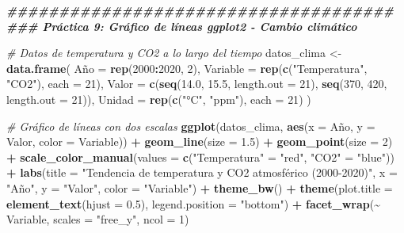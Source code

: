 \documentclass[
]{article}
\newenvironment{Shaded}{\begin{snugshade}}{\end{snugshade}}
\newcommand{\AttributeTok}[1]{\textcolor[rgb]{0.13,0.29,0.53}{#1}}
\newcommand{\CommentTok}[1]{\textcolor[rgb]{0.56,0.35,0.01}{\textit{#1}}}
\newcommand{\DecValTok}[1]{\textcolor[rgb]{0.00,0.00,0.81}{#1}}
\newcommand{\DocumentationTok}[1]{\textcolor[rgb]{0.56,0.35,0.01}{\textbf{\textit{#1}}}}
\newcommand{\FloatTok}[1]{\textcolor[rgb]{0.00,0.00,0.81}{#1}}
\newcommand{\FunctionTok}[1]{\textcolor[rgb]{0.13,0.29,0.53}{\textbf{#1}}}
\newcommand{\NormalTok}[1]{#1}
\newcommand{\OtherTok}[1]{\textcolor[rgb]{0.56,0.35,0.01}{#1}}
\newcommand{\SpecialCharTok}[1]{\textcolor[rgb]{0.81,0.36,0.00}{\textbf{#1}}}
\newcommand{\StringTok}[1]{\textcolor[rgb]{0.31,0.60,0.02}{#1}}
\begin{document}
\begin{Shaded}
\begin{Highlighting}[]
\DocumentationTok{\#\#\#\#\#\#\#\#\#\#\#\#\#\#\#\#\#\#\#\#\#\#\#\#\#\#\#\#\#\#\#\#\#\#\#\#\#}
\DocumentationTok{\#\#\# Práctica 9: Gráfico de líneas ggplot2 {-} Cambio climático}

\CommentTok{\# Datos de temperatura y CO2 a lo largo del tiempo}
\NormalTok{datos\_clima }\OtherTok{\textless{}{-}} \FunctionTok{data.frame}\NormalTok{(}
\NormalTok{  Año }\OtherTok{=} \FunctionTok{rep}\NormalTok{(}\DecValTok{2000}\SpecialCharTok{:}\DecValTok{2020}\NormalTok{, }\DecValTok{2}\NormalTok{),}
  \AttributeTok{Variable =} \FunctionTok{rep}\NormalTok{(}\FunctionTok{c}\NormalTok{(}\StringTok{"Temperatura"}\NormalTok{, }\StringTok{"CO2"}\NormalTok{), }\AttributeTok{each =} \DecValTok{21}\NormalTok{),}
  \AttributeTok{Valor =} \FunctionTok{c}\NormalTok{(}\FunctionTok{seq}\NormalTok{(}\FloatTok{14.0}\NormalTok{, }\FloatTok{15.5}\NormalTok{, }\AttributeTok{length.out =} \DecValTok{21}\NormalTok{), }
            \FunctionTok{seq}\NormalTok{(}\DecValTok{370}\NormalTok{, }\DecValTok{420}\NormalTok{, }\AttributeTok{length.out =} \DecValTok{21}\NormalTok{)),}
  \AttributeTok{Unidad =} \FunctionTok{rep}\NormalTok{(}\FunctionTok{c}\NormalTok{(}\StringTok{"°C"}\NormalTok{, }\StringTok{"ppm"}\NormalTok{), }\AttributeTok{each =} \DecValTok{21}\NormalTok{)}
\NormalTok{)}

\CommentTok{\# Gráfico de líneas con dos escalas}
\FunctionTok{ggplot}\NormalTok{(datos\_clima, }\FunctionTok{aes}\NormalTok{(}\AttributeTok{x =}\NormalTok{ Año, }\AttributeTok{y =}\NormalTok{ Valor, }\AttributeTok{color =}\NormalTok{ Variable)) }\SpecialCharTok{+}
  \FunctionTok{geom\_line}\NormalTok{(}\AttributeTok{size =} \FloatTok{1.5}\NormalTok{) }\SpecialCharTok{+}
  \FunctionTok{geom\_point}\NormalTok{(}\AttributeTok{size =} \DecValTok{2}\NormalTok{) }\SpecialCharTok{+}
  \FunctionTok{scale\_color\_manual}\NormalTok{(}\AttributeTok{values =} \FunctionTok{c}\NormalTok{(}\StringTok{"Temperatura"} \OtherTok{=} \StringTok{"red"}\NormalTok{, }\StringTok{"CO2"} \OtherTok{=} \StringTok{"blue"}\NormalTok{)) }\SpecialCharTok{+}
  \FunctionTok{labs}\NormalTok{(}\AttributeTok{title =} \StringTok{"Tendencia de temperatura y CO2 atmosférico (2000{-}2020)"}\NormalTok{,}
       \AttributeTok{x =} \StringTok{"Año"}\NormalTok{,}
       \AttributeTok{y =} \StringTok{"Valor"}\NormalTok{,}
       \AttributeTok{color =} \StringTok{"Variable"}\NormalTok{) }\SpecialCharTok{+}
  \FunctionTok{theme\_bw}\NormalTok{() }\SpecialCharTok{+}
  \FunctionTok{theme}\NormalTok{(}\AttributeTok{plot.title =} \FunctionTok{element\_text}\NormalTok{(}\AttributeTok{hjust =} \FloatTok{0.5}\NormalTok{),}
        \AttributeTok{legend.position =} \StringTok{"bottom"}\NormalTok{) }\SpecialCharTok{+}
  \FunctionTok{facet\_wrap}\NormalTok{(}\SpecialCharTok{\textasciitilde{}}\NormalTok{ Variable, }\AttributeTok{scales =} \StringTok{"free\_y"}\NormalTok{, }\AttributeTok{ncol =} \DecValTok{1}\NormalTok{)}
\end{Highlighting}
\end{Shaded}
\end{document}
